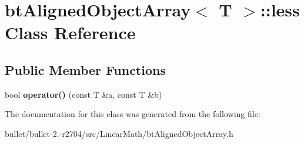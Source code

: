 \hypertarget{classbt_aligned_object_array_1_1less}{\section{bt\+Aligned\+Object\+Array$<$ T $>$\+:\+:less Class Reference}
\label{classbt_aligned_object_array_1_1less}
}
\subsection*{Public Member Functions}
\begin{DoxyCompactItemize}
\item 
\hypertarget{classbt_aligned_object_array_1_1less_a79f471a8270acde691dfb516fd9fe11a}{bool {\bfseries operator()} (const T \&a, const T \&b)}\label{classbt_aligned_object_array_1_1less_a79f471a8270acde691dfb516fd9fe11a}

\end{DoxyCompactItemize}


The documentation for this class was generated from the following file\+:\begin{DoxyCompactItemize}
\item 
bullet/bullet-\/2.-\/r2704/src/\+Linear\+Math/bt\+Aligned\+Object\+Array.\+h\end{DoxyCompactItemize}
